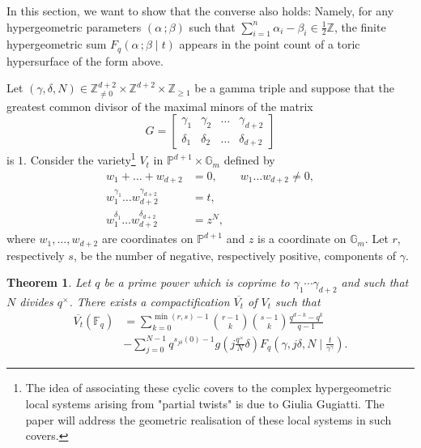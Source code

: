 \documentclass[11pt, reqno]{amsart}
\theoremstyle{plain}
\newtheorem{theo}{Theorem}[section]
\theoremstyle{definition}
\newcommand{\Z}{\mathbb{Z}}
\newcommand{\Ps}{\mathbb{P}}
\newcommand{\F}{\mathbb{F}}
\newcommand{\ga}{\gamma}
\newcommand{\G}{\mathbb{G}}
\newcommand{\be}{\beta}
\newcommand{\al}{\alpha}
\begin{document}
In this section, we want to show that the converse also holds: 
Namely, for any hypergeometric parameters $(\al \, ; \be)$ such that $\sum_{i=1}^{n} \al_i - \be_i \in \frac{1}{2}\mathbb{Z}$, the finite hypergeometric sum $F_q(\al \, ; \be \mid t )$ appears in the point count of a toric hypersurface of the form above.

Let $(\ga, \delta,N) \in \Z^{d+2}_{\neq0}\times \Z^{d+2} \times \Z_{\ge1}$ be a gamma triple and suppose that the greatest common divisor of the maximal minors of the matrix
\[
G= \begin{bmatrix}
\ga_1 &\ga_2 & \dots &\ga_{d+2} \\
\delta_1& \delta_2 &  \dots & \delta_{d+2} 
\end{bmatrix}
\]
is $1.$ Consider the variety\footnote{The idea of associating these cyclic covers to the complex hypergeometric local systems arising from "partial twists" is due to Giulia Gugiatti. The paper \cite{partial-twists} will address the geometric realisation of these local systems in such covers.} $V_t$ in $\Ps^{d+1} \times \G_m$ defined by
\begin{align*}
    w_1 + \dots +w_{d+2} &= 0, \qquad w_1\dots w_{d+2} \neq 0,\\
    w_1^{\ga_1}\dots w_{d+2}^{\ga_{d+2}} &= t,\\
    w_1^{\delta_1} \dots w_{d+2}^{\delta_{d+2}} &= z^{N},
\end{align*}
where $w_1, \dots, w_{d+2}$ are coordinates on $\Ps^{d+1}$ and $z$ is a coordinate on $\G_m$. 
Let $r$, respectively $s$, be the number of negative, respectively positive, components of $\ga$.
\begin{theo}\label{theo:realisation}
Let $q$ be a prime power which is coprime to $\ga_1 \cdots\ga_{d+2}$ and such that $N$ divides $q^\times$.  There exists a compactification $\overline{V_t}$ of $V_t$ such that
   \begin{align*}
    \overline{V_t}(\F_q) &=  \sum_{k=0}^{\min{(r,s)-1}} {\binom{r-1}{k}}{\binom{s-1}{k}} \frac{q^{d-k} - q^{k} }{q-1} \\
    &-\sum_{j=0}^{N-1} q^{s_{j\delta}(0)-1} g\left(j\frac{q^\times}{N} \delta \right) F_q\left(\gamma, j \delta, N \mid \frac{t}{\gamma^\gamma}\right).
    \end{align*}
\end{theo}
\end{document}
